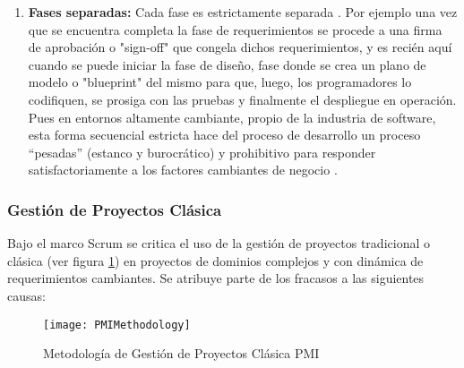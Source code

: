 \begin{enumerate}
\item \textbf{Fases separadas:} \newline
Cada fase es estrictamente separada \cite{Scrum-Institute-2015}. Por ejemplo una vez que se encuentra completa la fase de requerimientos se procede a una firma de aprobación o "sign-off" que congela dichos requerimientos, y es recién aquí cuando se puede iniciar la fase de diseño, fase donde se crea un plano de modelo o "blueprint" del mismo para que, luego, los programadores lo codifiquen, se prosiga con las pruebas y finalmente el despliegue en operación. Pues en entornos altamente cambiante, propio de la industria de software, esta forma secuencial estricta hace del proceso de desarrollo un proceso “pesadas” (estanco y burocrático) y prohibitivo para responder satisfactoriamente a los factores cambiantes de negocio \cite{Martin-Alaimo-2014}.

\end{enumerate}

\subsubsection{Gestión de Proyectos Clásica}

Bajo el marco Scrum se critica el uso de la gestión de proyectos tradicional o clásica (ver figura \ref{fig:PMIMethodology}) en proyectos de dominios complejos y con dinámica de requerimientos cambiantes. Se atribuye parte de los fracasos a las siguientes causas:

\begin{figure}[h]
  \centering
  \texttt{[image: PMIMethodology]}
  \caption{Metodología de Gestión de Proyectos Clásica PMI}
  \centering
  \label{fig:PMIMethodology} %
\end{figure}

